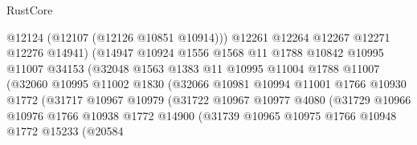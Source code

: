 \begin{lexlean}{RustCore}
\begin{coremodule}
                                  @12124
                                  (@12107 (@12126 @10851 @10914)))
                                @12261
                                @12264
                                @12267
                                @12271
                                @12276
                                @14941)
                              (@14947
                                @10924
                                @1556
                                @1568
                                @11
                                @1788
                                @10842
                                @10995
                                @11007
                                @34153
                                (@32048
                                  @1563
                                  @1383
                                  @11
                                  @10995
                                  @11004
                                  @1788
                                  @11007
                                  (@32060
                                    @10995
                                    @11002
                                    @1830
                                    (@32066
                                      @10981
                                      @10994
                                      @11001
                                      @1766
                                      @10930
                                      @1772
                                      (@31717
                                        @10967
                                        @10979
                                        (@31722
                                          @10967
                                          @10977
                                          @4080
                                          (@31729
                                            @10966
                                            @10976
                                            @1766
                                            @10938
                                            @1772
                                            @14900
                                            (@31739
                                              @10965
                                              @10975
                                              @1766
                                              @10948
                                              @1772
                                              @15233
                                              (@20584

\end{coremodule}
\end{lexlean}
